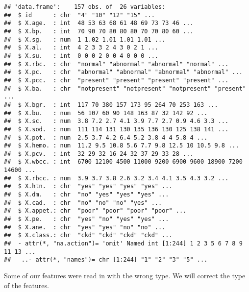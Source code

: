 \documentclass[
]{article}
\begin{document}
\begin{verbatim}
## 'data.frame':    157 obs. of  26 variables:
##  $ id      : chr  "4" "10" "12" "15" ...
##  $ X.age.  : int  48 53 63 68 61 48 69 73 73 46 ...
##  $ X.bp.   : int  70 90 70 80 80 80 70 70 80 60 ...
##  $ X.sg.   : num  1 1.02 1.01 1.01 1.01 ...
##  $ X.al.   : int  4 2 3 3 2 4 3 0 2 1 ...
##  $ X.su.   : int  0 0 0 2 0 0 4 0 0 0 ...
##  $ X.rbc.  : chr  "normal" "abnormal" "abnormal" "normal" ...
##  $ X.pc.   : chr  "abnormal" "abnormal" "abnormal" "abnormal" ...
##  $ X.pcc.  : chr  "present" "present" "present" "present" ...
##  $ X.ba.   : chr  "notpresent" "notpresent" "notpresent" "present" ...
##  $ X.bgr.  : int  117 70 380 157 173 95 264 70 253 163 ...
##  $ X.bu.   : num  56 107 60 90 148 163 87 32 142 92 ...
##  $ X.sc.   : num  3.8 7.2 2.7 4.1 3.9 7.7 2.7 0.9 4.6 3.3 ...
##  $ X.sod.  : num  111 114 131 130 135 136 130 125 138 141 ...
##  $ X.pot.  : num  2.5 3.7 4.2 6.4 5.2 3.8 4 4 5.8 4 ...
##  $ X.hemo. : num  11.2 9.5 10.8 5.6 7.7 9.8 12.5 10 10.5 9.8 ...
##  $ X.pcv.  : int  32 29 32 16 24 32 37 29 33 28 ...
##  $ X.wbcc. : int  6700 12100 4500 11000 9200 6900 9600 18900 7200 14600 ...
##  $ X.rbcc. : num  3.9 3.7 3.8 2.6 3.2 3.4 4.1 3.5 4.3 3.2 ...
##  $ X.htn.  : chr  "yes" "yes" "yes" "yes" ...
##  $ X.dm.   : chr  "no" "yes" "yes" "yes" ...
##  $ X.cad.  : chr  "no" "no" "no" "yes" ...
##  $ X.appet.: chr  "poor" "poor" "poor" "poor" ...
##  $ X.pe.   : chr  "yes" "no" "yes" "yes" ...
##  $ X.ane.  : chr  "yes" "yes" "no" "no" ...
##  $ X.class.: chr  "ckd" "ckd" "ckd" "ckd" ...
##  - attr(*, "na.action")= 'omit' Named int [1:244] 1 2 3 5 6 7 8 9 11 13 ...
##   ..- attr(*, "names")= chr [1:244] "1" "2" "3" "5" ...
\end{verbatim}

Some of our features were read in with the wrong type. We will correct
the type of the features.
\end{document}
